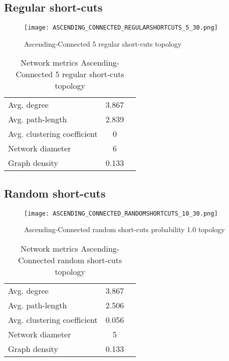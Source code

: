 \documentclass[Bachelorarbeit.tex]{subfiles}
\begin{document}
\subsection{Regular short-cuts}
\begin{figure}[H]
	\centering
  \texttt{[image: ASCENDING\_CONNECTED\_REGULARSHORTCUTS\_5\_30.png]}
	\caption{Ascending-Connected 5 regular short-cuts topology}
	\label{fig:topology_ASCENDING_CONNECTED_REGULARSHORTCUTS_5_30}
\end{figure}

\begin{table}[h]
	\centering
	\caption{Network metrics Ascending-Connected 5 regular short-cuts topology}
	\begin{tabular} { l c r }
		\hline
		Avg. degree & 3.867 \\
		Avg. path-length & 2.839 \\
		Avg. clustering coefficient & 0 \\
		Network diameter & 6 \\
		Graph density & 0.133\\
		\hline
	\end{tabular}
\end{table}

\subsection{Random short-cuts}
\begin{figure}[H]
	\centering
  \texttt{[image: ASCENDING\_CONNECTED\_RANDOMSHORTCUTS\_10\_30.png]}
	\caption{Ascending-Connected random short-cuts probability 1.0 topology}
	\label{fig:topology_ASCENDING_CONNECTED_RANDOMSHORTCUTS_10_30}
\end{figure}

\begin{table}[h]
	\centering
	\caption{Network metrics Ascending-Connected random short-cuts topology}
	\begin{tabular} { l c r }
		\hline
		Avg. degree & 3.867 \\
		Avg. path-length & 2.506 \\
		Avg. clustering coefficient & 0.056 \\
		Network diameter & 5 \\
		Graph density & 0.133\\
		\hline
	\end{tabular}
\end{table}
\end{document}
